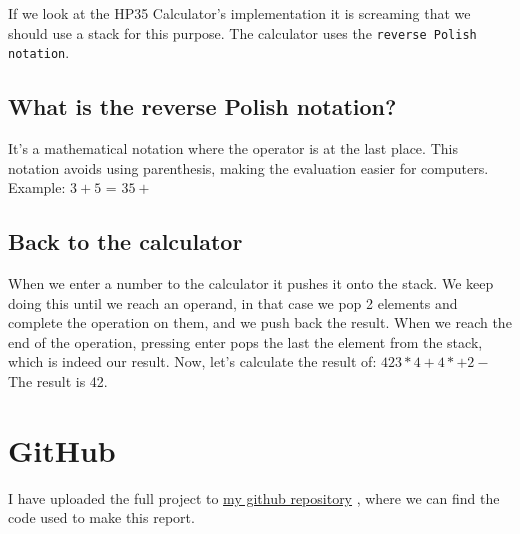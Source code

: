 \documentclass[a4paper,11pt]{article}
\newcommand{\underlinehref}[2]{%
    \href{#1}{\ul{#2}}%
}
\begin{document}
    If we look at the HP35 Calculator's implementation it is screaming that we should use a stack for this purpose.
    The calculator uses the {\tt reverse Polish notation}.

    \subsection*{What is the reverse Polish notation?}

    It's a mathematical notation where the operator is at the last place.
    This notation avoids using parenthesis, making the evaluation easier for computers.
    Example: $3 + 5$ = $3 5 +$

    \subsection*{Back to the calculator}
    When we enter a number to the calculator it pushes it onto the stack.
    We keep doing this until we reach an operand, in that case we pop 2 elements and complete the operation on them, and we push back the result.
    When we reach the end of the operation, pressing enter pops the last the element from the stack, which is indeed our result.
    Now, let's calculate the result of:
    $4 2 3 * 4 + 4 * + 2 -$
    The result is 42.

    \section*{GitHub}
    I have uploaded the full project to \underlinehref{https://github.com/peterherczku/ID1021/tree/main/assignment-2}{my github repository}, where we can find the code used to make this report.
\end{document}
